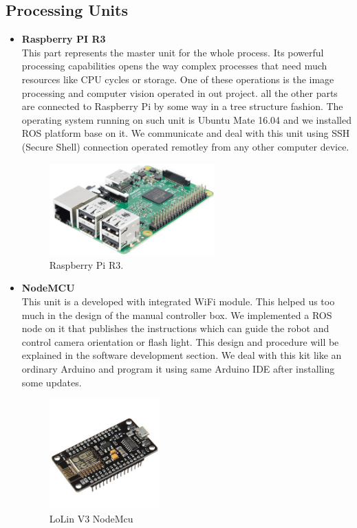 \documentclass[12pt]{book}
\begin{document}
\subsection{Processing Units}
\begin{itemize}
	\item \textbf{Raspberry PI R3}\\
	This part represents the master unit for the whole process. Its powerful processing capabilities opens the way complex processes that need much resources like CPU cycles or storage. One of these operations is the image processing and computer vision operated in out project. all the other parts are connected to Raspberry Pi by some way in a tree structure fashion. The operating system running on such unit is Ubuntu Mate 16.04 and we installed ROS platform base on it. We communicate and deal with this unit using SSH (Secure Shell) connection operated remotley from any other computer device.
	\begin{figure}
		\centering
		\includegraphics[width =0.6\textwidth]{Fig/Electronics/Raspberry.png}
		\caption{Raspberry Pi R3.}
		\label{fig:raspberry}
	\end{figure}

	\item \textbf{NodeMCU}\\
	This unit is a developed with integrated WiFi module. This helped us too much in the design of the manual controller box. We implemented a ROS node on it that publishes the instructions which can guide the robot and control camera orientation or flash light. This design and procedure will be explained in the software development section.
	We deal with this kit like an ordinary Arduino and program it using same Arduino IDE after installing some updates.
	
	\begin{figure}
		\centering
		\includegraphics[width =0.4\textwidth]{Fig/Electronics/nodemcu.jpg}
		\caption{LoLin V3 NodeMcu}
		\label{fig:nodemcu}
	\end{figure}
	

\end{itemize}
\end{document}
